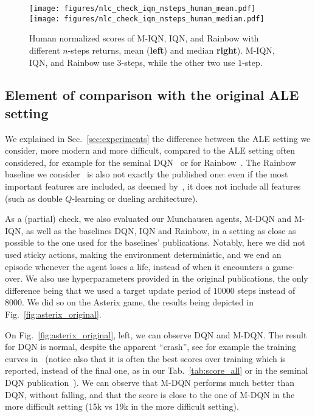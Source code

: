 \documentclass{article}
\begin{document}
\begin{figure}
    \centering
    \texttt{[image: figures/nlc\_check\_iqn\_nsteps\_human\_mean.pdf]}
    \texttt{[image: figures/nlc\_check\_iqn\_nsteps\_human\_median.pdf]}
    \caption{Human normalized scores of M-IQN, IQN, and Rainbow with different $n$-steps returns, mean (\textbf{left}) and median \textbf{right}). M-IQN, IQN, and Rainbow use $3$-steps, while the other two use $1$-step.}
    \label{fig:n_steps}
\end{figure}

\subsection{Element of comparison with the original ALE setting}
\label{subappx:settings}

We explained in Sec.~\ref{sec:experiments} the difference between the ALE setting we consider, more modern and more difficult, compared to the ALE setting often considered, for example for the seminal DQN~\cite{mnih2015human} or for Rainbow~\cite{hessel2018rainbow}. The Rainbow baseline we consider~\cite{castro2018dopamine} is also not exactly the published one: even if the most important features are included, as deemed by~\citet{hessel2018rainbow}, it does not include all features (such as double $Q$-learning or dueling architecture).

As a (partial) check, we also evaluated our Munchausen agents, M-DQN and M-IQN, as well as the baselines DQN, IQN and Rainbow, in a setting as close as possible to the one used for the baselines' publications. Notably, here we did not used sticky actions, making the environment deterministic, and we end an episode whenever the agent loses a life, instead of when it encounters a game-over. We also use hyperparameters provided in the original publications, the only difference being that we used a target update period of $10000$ steps instead of $8000$. We did so on the Asterix game, the results being depicted in Fig.~\ref{fig:asterix_original}.

On Fig.~\ref{fig:asterix_original}, left, we can observe DQN and M-DQN. The result for DQN is normal, despite the apparent ``crash'', see for example the training curves in~\cite{hessel2018rainbow} (notice also that it is often the best scores over training which is reported, instead of the final one, as in our Tab.~\ref{tab:score_all} or in the seminal DQN publication~\cite{mnih2015human}). We can observe that M-DQN performs much better than DQN, without falling, and that the score is close to the one of M-DQN in the more difficult setting (15k vs 19k in the more difficult setting).
\end{document}
